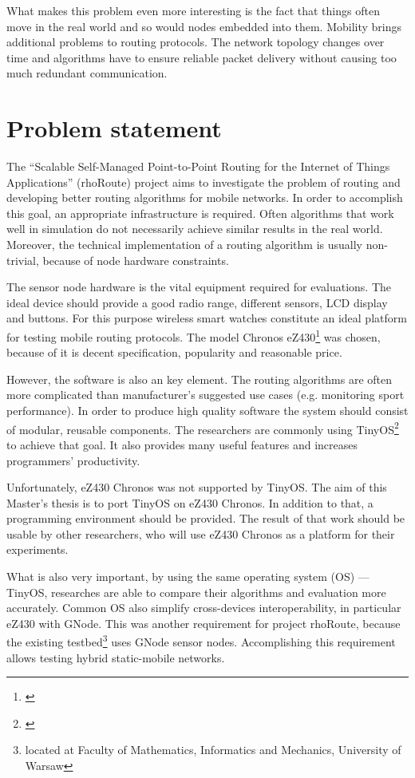 What makes this problem even more interesting is the fact that things often move in the real world and so would nodes embedded into them.
Mobility brings additional problems to routing protocols.
The network topology changes over time and algorithms have to ensure reliable packet delivery without causing too much redundant communication.


\section{Problem statement}
The ``Scalable Self-Managed Point-to-Point Routing for the Internet of Things Applications'' (rhoRoute) project aims to investigate the problem of routing and developing better routing algorithms for mobile networks.
In order to accomplish this goal, an appropriate infrastructure is required.
Often algorithms that work well in simulation do not necessarily achieve similar results in the real world.
Moreover, the technical implementation of a routing algorithm is usually non-trivial, because of node hardware constraints.

The sensor node hardware is the vital equipment required for evaluations.
The ideal device should provide a good radio range, different sensors, LCD display and buttons.
For this purpose wireless smart watches constitute an ideal platform for testing mobile routing protocols.
The model Chronos eZ430\footnote{\cite{eZ430Chronos}} was chosen, because of it is decent specification, popularity and reasonable price.

However, the software is also an key element.
The routing algorithms are often more complicated than manufacturer's suggested use cases (e.g. monitoring sport performance). 
In order to produce high quality software the system should consist of modular, reusable components.
The researchers are commonly using TinyOS\footnote{\cite{TinyOS}} to achieve that goal.
It also provides many useful features and increases programmers' productivity.

Unfortunately, eZ430 Chronos was not supported by TinyOS.
The aim of this Master's thesis is to port TinyOS on eZ430 Chronos. 
In addition to that, a programming environment should be provided.
The result of that work should be usable by other researchers, who will use eZ430 Chronos as a platform for their experiments. 

What is also very important, by using the same operating system (OS) --- TinyOS, researches are able to compare their algorithms and evaluation more accurately. 
Common OS also simplify cross-devices interoperability, in particular eZ430 with GNode.
This was another requirement for project rhoRoute, because the existing testbed\footnote{located at Faculty of Mathematics, Informatics and Mechanics, University of Warsaw} uses GNode sensor nodes.
Accomplishing this requirement allows testing hybrid static-mobile networks.

